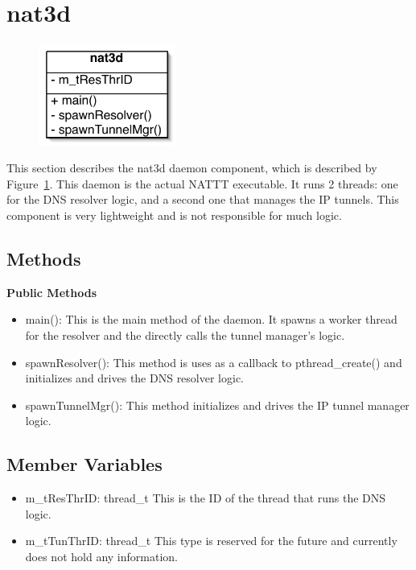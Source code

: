 \section{nat3d}\label{sec:nat3d}

\begin{figure}
\begin{center}
\includegraphics[width=0.4\textwidth]{figs/nat3d}
\end{center}
\caption{}
\label{fig:nat3d}
\end{figure}

This section describes the nat3d daemon component, which is described by Figure~\ref{fig:nat3d}.  This daemon is the actual NATTT
executable.  It runs 2 threads: one for the DNS resolver logic, and a second one that manages the IP tunnels.  This component is very
lightweight and is not responsible for much logic.


\subsection{Methods}

{\bf Public Methods}
\begin{itemize}
\item main(): This is the main method of the daemon.  It spawns a worker thread for the resolver and the directly calls the tunnel manager's
logic.
\item spawnResolver(): This method is uses as a callback to pthread\_create() and initializes and drives the DNS resolver logic.
\item spawnTunnelMgr(): This method initializes and drives the IP tunnel manager logic.
\end{itemize}

\subsection{Member Variables}
\begin{itemize}
\item m\_tResThrID: thread\_t This is the ID of the thread that runs the DNS logic.
\item m\_tTunThrID: thread\_t This type is reserved for the future and currently does not hold any information.
\end{itemize}
